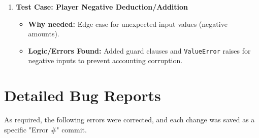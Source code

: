 \documentclass{article}
\begin{document}
\begin{enumerate}
    \item \textbf{Test Case: Player Negative Deduction/Addition}
    \begin{itemize}
        \item \textbf{Why needed:} Edge case for unexpected input values (negative amounts).
        \item \textbf{Logic/Errors Found:} Added guard clauses and \texttt{ValueError} raises for negative inputs to prevent accounting corruption.
    \end{itemize}
\end{enumerate}

\section{Detailed Bug Reports}
As required, the following errors were corrected, and each change was saved as a specific "Error #" commit.
\end{document}
